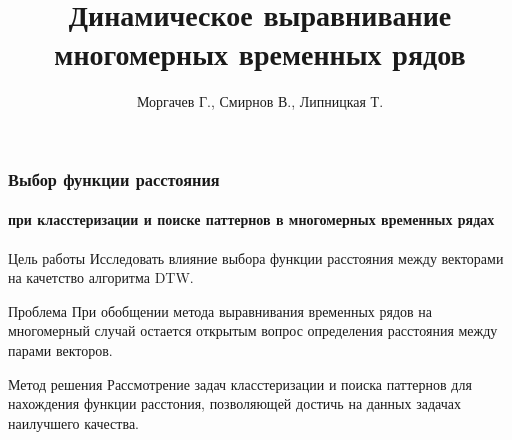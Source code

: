 \documentclass{beamer}
\title[\hbox to 56mm{DTW  \hfill\insertframenumber\,/\,\inserttotalframenumber}]
{Динамическое выравнивание многомерных временных рядов}
\author{Моргачев Г., Смирнов В., Липницкая Т.}
\institute{Московский физико-технический институт}
\date{\footnotesize{
\par\emph{Курс:} Автоматизация научных исследований в машинном обучении\par (практика, В.В. Стрижов)/2019
\par\emph{Консультант:} Гончаров А.
\date{\today}
}}
\begin{document}

\begin{frame}
\titlepage 
\end{frame}


\begin{frame}
\frametitle{Выбор функции расстояния}
\framesubtitle{при класстеризации и поиске паттернов в многомерных временных рядах}
    \begin{block}{Цель работы}
        Исследовать влияние выбора функции расстояния между векторами на 
        качетство алгоритма DTW.
    \end{block}
    \begin{block}{Проблема}
        При обобщении метода выравнивания временных рядов на многомерный случай остается 
        открытым вопрос определения расстояния между парами векторов.
    \end{block}
    \begin{block}{Метод решения}
        Рассмотрение задач класстеризации и поиска паттернов для нахождения функции расстония,
        позволяющей достичь на данных задачах наилучшего качества.
    \end{block}
\end{frame}
\end{document}
